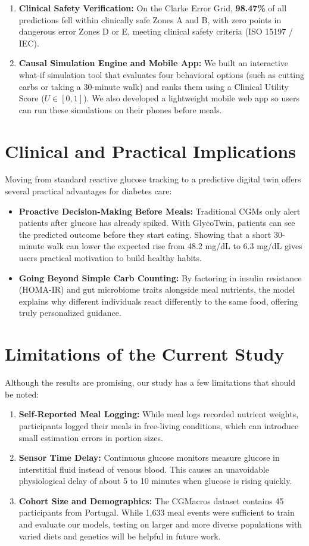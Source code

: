 \begin{enumerate}
    \item \textbf{Clinical Safety Verification:} On the Clarke Error Grid, \textbf{98.47\%} of all predictions fell within clinically safe Zones A and B, with zero points in dangerous error Zones D or E, meeting clinical safety criteria (ISO 15197 / IEC).
    \item \textbf{Causal Simulation Engine and Mobile App:} We built an interactive what-if simulation tool that evaluates four behavioral options (such as cutting carbs or taking a 30-minute walk) and ranks them using a Clinical Utility Score ($U \in [0, 1]$). We also developed a lightweight mobile web app so users can run these simulations on their phones before meals.
\end{enumerate}

\section{Clinical and Practical Implications}
Moving from standard reactive glucose tracking to a predictive digital twin offers several practical advantages for diabetes care:
\begin{itemize}
    \item \textbf{Proactive Decision-Making Before Meals:} Traditional CGMs only alert patients after glucose has already spiked. With GlycoTwin, patients can see the predicted outcome before they start eating. Showing that a short 30-minute walk can lower the expected rise from 48.2 mg/dL to 6.3 mg/dL gives users practical motivation to build healthy habits.
    \item \textbf{Going Beyond Simple Carb Counting:} By factoring in insulin resistance (HOMA-IR) and gut microbiome traits alongside meal nutrients, the model explains why different individuals react differently to the same food, offering truly personalized guidance.
\end{itemize}

\section{Limitations of the Current Study}
Although the results are promising, our study has a few limitations that should be noted:
\begin{enumerate}
    \item \textbf{Self-Reported Meal Logging:} While meal logs recorded nutrient weights, participants logged their meals in free-living conditions, which can introduce small estimation errors in portion sizes.
    \item \textbf{Sensor Time Delay:} Continuous glucose monitors measure glucose in interstitial fluid instead of venous blood. This causes an unavoidable physiological delay of about 5 to 10 minutes when glucose is rising quickly.
    \item \textbf{Cohort Size and Demographics:} The CGMacros dataset contains 45 participants from Portugal. While 1,633 meal events were sufficient to train and evaluate our models, testing on larger and more diverse populations with varied diets and genetics will be helpful in future work.
\end{enumerate}

